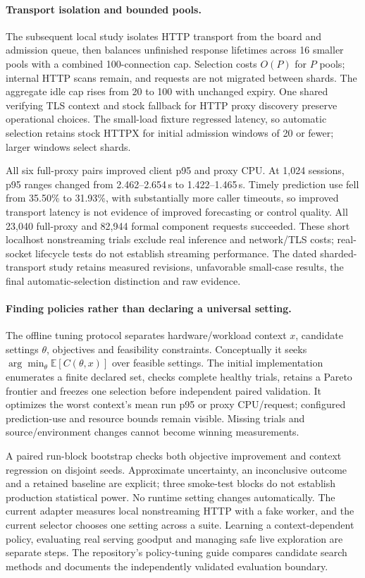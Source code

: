 \paragraph{Transport isolation and bounded pools.}
The subsequent local study isolates HTTP transport from the board and admission
queue, then balances unfinished response lifetimes across 16 smaller pools with
a combined 100-connection cap. Selection costs $O(P)$ for $P$ pools; internal
HTTP scans remain, and requests are not migrated between shards. The aggregate
idle cap rises from 20 to 100 with unchanged expiry. One shared verifying TLS
context and stock fallback for HTTP proxy discovery preserve operational choices.
The small-load fixture regressed latency, so automatic selection retains stock
HTTPX for initial admission windows of 20 or fewer; larger windows select shards.

All six full-proxy pairs improved client p95 and proxy CPU. At 1,024 sessions,
p95 ranges changed from 2.462--2.654\,s to 1.422--1.465\,s. Timely prediction use
fell from 35.50\% to 31.93\%, with substantially more caller timeouts, so improved
transport latency is not evidence of improved forecasting or control quality.
All 23,040 full-proxy and 82,944 formal component requests succeeded. These short
localhost nonstreaming trials exclude real inference and network/TLS costs;
real-socket lifecycle tests do not establish streaming performance. The dated
sharded-transport study retains measured revisions, unfavorable small-case
results, the final automatic-selection distinction and raw evidence.


\paragraph{Finding policies rather than declaring a universal setting.}
The offline tuning protocol separates hardware/workload context $x$, candidate
settings $\theta$, objectives and feasibility constraints. Conceptually it seeks
$\arg\min_\theta\mathbb{E}[C(\theta,x)]$ over feasible settings. The initial
implementation enumerates a finite declared set, checks complete healthy trials,
retains a Pareto frontier and freezes one selection before independent paired
validation. It optimizes the worst context's mean run p95 or proxy CPU/request;
configured prediction-use and resource bounds remain visible. Missing trials
and source/environment changes cannot become winning measurements.

A paired run-block bootstrap checks both objective improvement and context
regression on disjoint seeds. Approximate uncertainty, an inconclusive outcome
and a retained baseline are explicit; three smoke-test blocks do not establish
production statistical power. No runtime setting changes automatically. The
current adapter measures local nonstreaming HTTP with a fake worker, and the
current selector chooses one setting across a suite. Learning a context-dependent
policy, evaluating real serving goodput and managing safe live exploration are
separate steps. The repository's policy-tuning guide compares candidate search
methods and documents the independently validated evaluation boundary.
